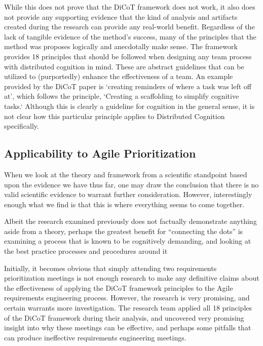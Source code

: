 While this does not prove that the DiCoT framework does not work, it also does not provide any supporting evidence that the kind of analysis and artifacts created during the research can provide any real-world benefit. Regardless of the lack of tangible evidence of the method's success, many of the principles that the method was proposes logically and anecdotally make sense. The framework provides 18 principles that should be followed when designing any team process with distributed cognition in mind. These are abstract guidelines that can be utilized to (purportedly) enhance the effectiveness of a team. An example provided by the DiCoT paper is `creating reminders of where a task was left off at', which follows the principle, `Creating a scaffolding to simplify cognitive tasks.` Although this is clearly a guideline for cognition in the general sense, it is not clear how this particular principle applies to Distributed Cognition specifically.

\subsection{Applicability to Agile Prioritization}
When we look at the theory and framework from a scientific standpoint based upon the evidence we have thus far, one may draw the conclusion that there is no valid scientific evidence to warrant further consideration. However, interestingly enough what we find is that this is where everything seems to come together.

Albeit the research examined previously does not factually demonstrate anything aside from a theory, perhaps the greatest benefit for ``connecting the dots'' is examining a process that is known to be cognitively demanding, and looking at the best practice processes and procedures around it

Initially, it becomes obvious that simply attending two requirements prioritization meetings is not enough research to make any definitive claims about the effectiveness of applying the DiCoT framework principles to the Agile requirements engineering process. However, the research is very promising, and certain warrants more investigation. The research team applied all 18 principles of the DiCoT framework during their analysis, and uncovered very promising insight into why these meetings can be effective, and perhaps some pitfalls that can produce ineffective requirements engineering meetings.

